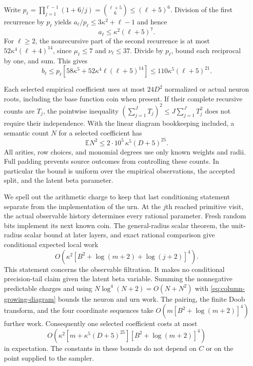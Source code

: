 Write $p_\ell=\prod_{j=1}^{\ell-1}(1+6/j)
=\binom{\ell+5}{6}\le(\ell+5)^6$.
Division of the first recurrence by $p_\ell$ yields
$a_\ell/p_\ell\le3\kappa^2+\ell-1$ and hence
\[
 a_\ell\le\kappa^2(\ell+5)^7.
\]
For $\ell\ge2$, the nonrecursive part of the second recurrence is
at most $52\kappa^4(\ell+4)^{14}$, since
$\mu_\ell\le7$ and $\nu_\ell\le37$.
Divide by $p_\ell$, bound each reciprocal by one, and sum.  This gives
\begin{equation}
 b_\ell\le p_\ell
  [58\kappa^5+52\kappa^4\ell(\ell+5)^{14}]
 \le110\kappa^5(\ell+5)^{21}.
 \label{eq:column-growing-tree}
\end{equation}

Each selected empirical coefficient uses at most $24D^2$
normalized or actual neuron roots, including the base function
coin when present.  If their complete recursive counts are $T_j$,
the pointwise inequality
$(\sum_{j=1}^{J}T_j)^2\le J\sum_{j=1}^{J}T_j^2$
does not require their independence.  With the linear diagram
bookkeeping included, a semantic count $N$ for a selected
coefficient has
\begin{equation}
 \mathbb E N^2\le
  2\cdot10^5\,\kappa^5(D+5)^{25}.
 \label{eq:column-growing-diagram}
\end{equation}
All arities, row choices, and monomial degrees use only known
weights and radii.  Full padding prevents source outcomes from
controlling these counts.  In particular the bound is uniform
over the empirical observations, the accepted split, and the
latent beta parameter.

We spell out the arithmetic charge to keep that last conditioning
statement separate from the implementation of the urn.  At the
$j$th reached primitive visit, the actual observable history
determines every rational parameter.  Fresh random bits implement
its next known coin.  The general-radius scalar theorem, the
unit-radius scalar bound at later layers, and exact rational
comparison give conditional expected local work
\[
 O\!\left(\kappa^2
  [B^2+\log(m+2)+\log(j+2)]^4\right).
\]
This statement concerns the observable filtration. It makes no
conditional precision-tail claim given the latent beta variable.
Summing the nonnegative predictable charges and using
$N\log^4(N+2)=O(N+N^2)$ with
\eqref{eq:column-growing-diagram} bounds the neuron and urn work.
The pairing, the finite Doob transform, and the four coordinate
sequences take $O(m[B^2+\log(m+2)]^4)$ further work.  Consequently
one selected coefficient costs at most
\begin{equation}
 O\!\left(
  \kappa^2[m+\kappa^5(D+5)^{25}]
       [B^2+\log(m+2)]^4\right)
 \label{eq:column-growing-coefficient}
\end{equation}
in expectation.  The constants in these bounds do not depend on
$C$ or on the point supplied to the sampler.


